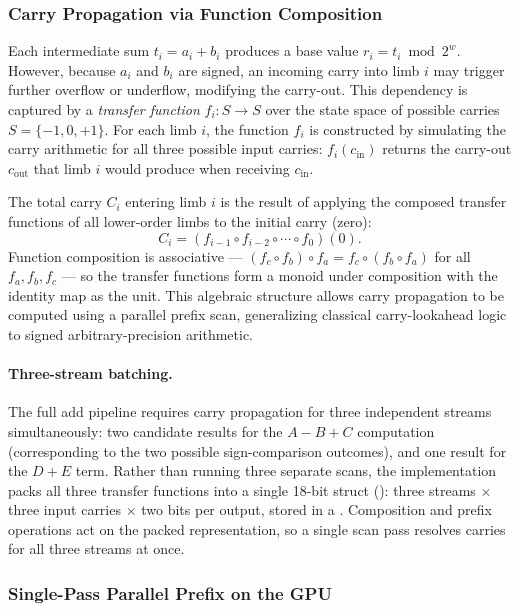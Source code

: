 \subsubsection{Carry Propagation via Function Composition}

Each intermediate sum $t_i = a_i + b_i$ produces a base value $r_i = t_i \bmod 2^w$. However, because $a_i$ and $b_i$ are signed, an incoming carry into limb $i$ may trigger further overflow or underflow, modifying the carry-out. This dependency is captured by a \emph{transfer function} $f_i: S \to S$ over the state space of possible carries $S = \{-1, 0, +1\}$. For each limb $i$, the function $f_i$ is constructed by simulating the carry arithmetic for all three possible input carries: $f_i(c_{\text{in}})$ returns the carry-out $c_{\text{out}}$ that limb $i$ would produce when receiving $c_{\text{in}}$.

The total carry $C_i$ entering limb $i$ is the result of applying the composed transfer functions of all lower-order limbs to the initial carry (zero):
\begin{equation}
C_i = (f_{i-1} \circ f_{i-2} \circ \cdots \circ f_0)(0).
\end{equation}
Function composition is associative --- $(f_c \circ f_b) \circ f_a = f_c \circ (f_b \circ f_a)$ for all $f_a, f_b, f_c$ --- so the transfer functions form a monoid under composition with the identity map as the unit. This algebraic structure allows carry propagation to be computed using a parallel prefix scan, generalizing classical carry-lookahead logic to signed arbitrary-precision arithmetic.

\paragraph{Three-stream batching.}
The full add pipeline requires carry propagation for three independent streams simultaneously: two candidate results for the $A - B + C$ computation (corresponding to the two possible sign-comparison outcomes), and one result for the $D + E$ term. Rather than running three separate scans, the implementation packs all three transfer functions into a single 18-bit struct (): three streams $\times$ three input carries $\times$ two bits per output, stored in a . Composition and prefix operations act on the packed representation, so a single scan pass resolves carries for all three streams at once.

\subsubsection{Single-Pass Parallel Prefix on the GPU}

